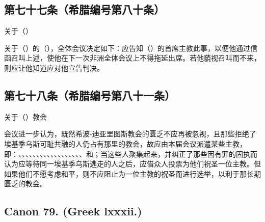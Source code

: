
\subsection{第七十七条（希腊编号第八十条）}

关于（）\par

关于（）的（），全体会议决定如下：应告知（）的首席主教此事，以便他通过信函召叫上述，使他在下一次非洲全体会议上不得拖延出席。若他藐视召叫而不来，则应让他知道应对他宣告判决。\par


\subsection{第七十八条（希腊编号第八十一条）}

关于（）教会\par

会议进一步认为，既然希波-迪亚里图斯教会的匮乏不应再被忽视，且那些拒绝了埃基季乌斯可耻共融的人仍占有那里的教会，故应由本届会议派遣某些主教，即：、、、、、、、、、、、、、、、、、、和；当这些人聚集起来，并纠正了那些因有罪的固执而认为应等待同一埃基季乌斯逃走的人之后，应借众人投票为他们祝圣一位主教。但如果他们不愿考虑和平，则不应阻止为一位主教的祝圣而进行选举，以利于那长期匮乏的教会。\par


\subsection{Canon 79. (Greek lxxxii.)}

